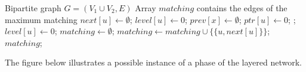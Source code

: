 \documentclass[12pt]{report}
\numberwithin{algorithm}{chapter}
\begin{document}
	\begin{algorithm}[H]
	\caption{Hopcroft--Karp Algorithm}
	\label{mainHK}
	\begin{algorithmic}[1]
	\Require Bipartite graph $G=(V_1 \cup V_2,E)$
	\Ensure Array $\mathit{matching}$ contains the edges of the maximum matching
			\State $\mathit{next}[u] \gets \emptyset$;
			\State $\mathit{level}[u] \gets 0$;
		\EndFor
			\State $\mathit{prev}[x] \gets \emptyset$;
		\EndFor
				\State $\mathit{ptr}[u] \gets 0$;
			\EndFor
					\State {};
				\EndIf
			\EndFor
				\State $\mathit{level}[u] \gets 0$;
			\EndFor
		\EndWhile
		\State $\mathit{matching} \gets \emptyset$;
				\State $\mathit{matching} \gets \mathit{matching} \cup \{\{u,\mathit{next}[u]\}\}$;
			\EndIf
		\EndFor
		\State \Return $\mathit{matching}$;
	\EndFunction
	\end{algorithmic}
	\end{algorithm}
	
	The figure below illustrates a possible instance of a phase of the layered network.
		
\end{document}
